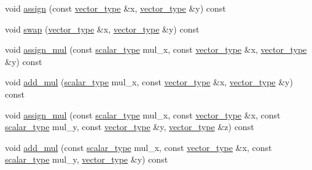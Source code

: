 \begin{DoxyCompactItemize}
\item 
void \hyperlink{structgpu__vector__operations_a37c9942c9bf26e8e0fd787d0dded4965}{assign} (const \hyperlink{structgpu__vector__operations_adfa9fd444da5616e33af37604dc206ba}{vector\-\_\-type} \&x, \hyperlink{structgpu__vector__operations_adfa9fd444da5616e33af37604dc206ba}{vector\-\_\-type} \&y) const 
\item 
void \hyperlink{structgpu__vector__operations_a29768a8d4f6da7a9d3d4a49d4517bb23}{swap} (\hyperlink{structgpu__vector__operations_adfa9fd444da5616e33af37604dc206ba}{vector\-\_\-type} \&x, \hyperlink{structgpu__vector__operations_adfa9fd444da5616e33af37604dc206ba}{vector\-\_\-type} \&y) const 
\item 
void \hyperlink{structgpu__vector__operations_a8602a5684374073ed5a5145fc82653a3}{assign\-\_\-mul} (const \hyperlink{structgpu__vector__operations_aaa9d1dc877967fabc2262c4a25e4796f}{scalar\-\_\-type} mul\-\_\-x, const \hyperlink{structgpu__vector__operations_adfa9fd444da5616e33af37604dc206ba}{vector\-\_\-type} \&x, \hyperlink{structgpu__vector__operations_adfa9fd444da5616e33af37604dc206ba}{vector\-\_\-type} \&y) const 
\item 
void \hyperlink{structgpu__vector__operations_ab3817e5f0634737c1247bcc0dc494736}{add\-\_\-mul} (\hyperlink{structgpu__vector__operations_aaa9d1dc877967fabc2262c4a25e4796f}{scalar\-\_\-type} mul\-\_\-x, const \hyperlink{structgpu__vector__operations_adfa9fd444da5616e33af37604dc206ba}{vector\-\_\-type} \&x, \hyperlink{structgpu__vector__operations_adfa9fd444da5616e33af37604dc206ba}{vector\-\_\-type} \&y) const 
\item 
void \hyperlink{structgpu__vector__operations_ac0c594794e5dded6d436aff3f84a5471}{assign\-\_\-mul} (const \hyperlink{structgpu__vector__operations_aaa9d1dc877967fabc2262c4a25e4796f}{scalar\-\_\-type} mul\-\_\-x, const \hyperlink{structgpu__vector__operations_adfa9fd444da5616e33af37604dc206ba}{vector\-\_\-type} \&x, const \hyperlink{structgpu__vector__operations_aaa9d1dc877967fabc2262c4a25e4796f}{scalar\-\_\-type} mul\-\_\-y, const \hyperlink{structgpu__vector__operations_adfa9fd444da5616e33af37604dc206ba}{vector\-\_\-type} \&y, \hyperlink{structgpu__vector__operations_adfa9fd444da5616e33af37604dc206ba}{vector\-\_\-type} \&z) const 
\item 
void \hyperlink{structgpu__vector__operations_a8ec73b65db7e5eee1e7f965c79ae4311}{add\-\_\-mul} (const \hyperlink{structgpu__vector__operations_aaa9d1dc877967fabc2262c4a25e4796f}{scalar\-\_\-type} mul\-\_\-x, const \hyperlink{structgpu__vector__operations_adfa9fd444da5616e33af37604dc206ba}{vector\-\_\-type} \&x, const \hyperlink{structgpu__vector__operations_aaa9d1dc877967fabc2262c4a25e4796f}{scalar\-\_\-type} mul\-\_\-y, \hyperlink{structgpu__vector__operations_adfa9fd444da5616e33af37604dc206ba}{vector\-\_\-type} \&y) const 

\end{DoxyCompactItemize}

